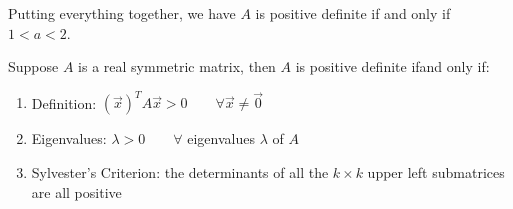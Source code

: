 \documentclass{report}
\begin{document}
{\begin{enumerate}[label=(\arabic*).]

       \\
       \\
       Putting everything together, we have $ A$ is positive definite if and only if $ 1 < a < 2$.
    \end{enumerate}
    
    }
    
    
 
   {
      Suppose $ A$ is a real symmetric matrix, then $ A$ is positive definite ifand only if:
      \begin{enumerate}[label=(\arabic*).]  
        \item Definition: $ \left( \vec{ x}  \right) ^{T}A \vec{ x} > 0 \qquad  \forall  \vec{ x }  \neq \vec{ 0} $
        \item    Eigenvalues: $ \lambda >0 \qquad  \forall $ eigenvalues $ \lambda $ of $ A$
        \item Sylvester's Criterion: the determinants of all the $ k \times  k$ upper left submatrices are all positive 
        \end{enumerate}
    }
      
\end{document}
